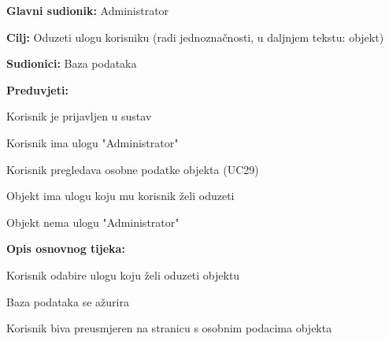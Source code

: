 					\noindent {}
					\begin{packed_item}
	
						\item \textbf{Glavni sudionik: }Administrator
						\item  \textbf{Cilj:} Oduzeti ulogu korisniku (radi jednoznačnosti, u daljnjem tekstu: objekt)
						\item  \textbf{Sudionici:} Baza podataka
						\item  \textbf{Preduvjeti:}
						\item[] \begin{packed_enum}
							\item Korisnik je prijavljen u sustav
							\item Korisnik ima ulogu "Administrator"
							\item Korisnik pregledava osobne podatke objekta (UC29)
							\item Objekt ima ulogu koju mu korisnik želi oduzeti
							\item Objekt nema ulogu "Administrator"
						\end{packed_enum}
						\item  \textbf{Opis osnovnog tijeka:}
						
						\item[] \begin{packed_enum}
	
							\item Korisnik odabire ulogu koju želi oduzeti objektu
							\item Baza podataka se ažurira
							\item Korisnik biva preusmjeren na stranicu s osobnim podacima objekta
						\end{packed_enum}
						
					\end{packed_item}
					
